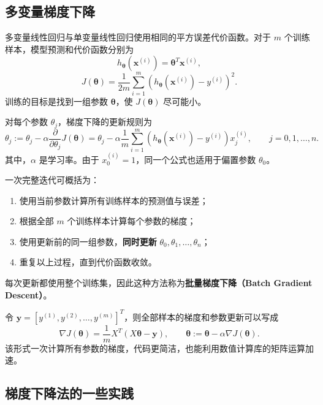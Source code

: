 \documentclass[12pt,a4paper]{ctexart}
\newcommand{\important}[1]{\textbf{\textcolor{MainColor}{#1}}}
\newcommand{\concept}[1]{\textbf{\textcolor{DefineColor}{#1}}}
\begin{document}
\subsection{多变量梯度下降}

\begin{definitionbox}[多变量线性回归的代价函数]
多变量线性回归与单变量线性回归使用相同的平方误差代价函数。对于 $m$ 个训练样本，模型预测和代价函数分别为
\[
  h_{\boldsymbol{\theta}}\!\left(\mathbf{x}^{(i)}\right)
  =\boldsymbol{\theta}^{T}\mathbf{x}^{(i)},
\]
\[
  J(\boldsymbol{\theta})
  =\frac{1}{2m}\sum_{i=1}^{m}
  \left(h_{\boldsymbol{\theta}}\!\left(\mathbf{x}^{(i)}\right)-y^{(i)}\right)^2.
\]
训练的目标是找到一组参数 $\boldsymbol{\theta}$，使 $J(\boldsymbol{\theta})$ 尽可能小。
\end{definitionbox}

\begin{keybox}[多变量的批量梯度下降]
对每个参数 $\theta_j$，梯度下降的更新规则为
\[
  \theta_j := \theta_j
  -\alpha\frac{\partial}{\partial\theta_j}J(\boldsymbol{\theta})
  =\theta_j-\alpha\frac{1}{m}\sum_{i=1}^{m}
  \left(h_{\boldsymbol{\theta}}\!\left(\mathbf{x}^{(i)}\right)-y^{(i)}\right)x_j^{(i)},
  \qquad j=0,1,\ldots,n.
\]
其中，$\alpha$ 是学习率。由于 $x_0^{(i)}=1$，同一个公式也适用于偏置参数 $\theta_0$。

一次完整迭代可概括为：
\begin{enumerate}
  \item 使用当前参数计算所有训练样本的预测值与误差；
  \item 根据全部 $m$ 个训练样本计算每个参数的梯度；
  \item 使用更新前的同一组参数，\important{同时更新} $\theta_0,\theta_1,\ldots,\theta_n$；
  \item 重复以上过程，直到代价函数收敛。
\end{enumerate}
每次更新都使用整个训练集，因此这种方法称为\concept{批量梯度下降（Batch Gradient Descent）}。
\end{keybox}

\begin{tipbox}[向量化更新]
令 $\mathbf{y}=[y^{(1)},y^{(2)},\ldots,y^{(m)}]^T$，则全部样本的梯度和参数更新可以写成
\[
  \nabla J(\boldsymbol{\theta})
  =\frac{1}{m}X^T\left(X\boldsymbol{\theta}-\mathbf{y}\right),
  \qquad
  \boldsymbol{\theta}:=\boldsymbol{\theta}
  -\alpha\nabla J(\boldsymbol{\theta}).
\]
该形式一次计算所有参数的梯度，代码更简洁，也能利用数值计算库的矩阵运算加速。
\end{tipbox}
\subsection{梯度下降法的一些实践}
\end{document}
